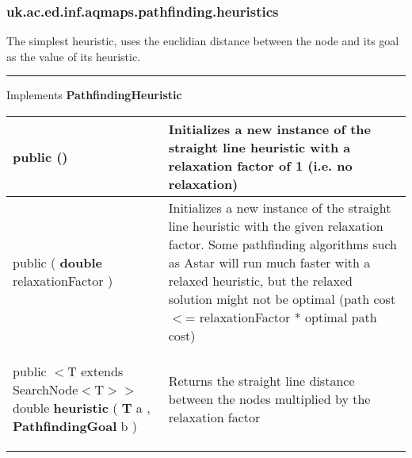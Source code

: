\subsubsection*{ uk.ac.ed.inf.aqmaps.pathfinding.heuristics }
 {\scriptsize The simplest heuristic, uses the euclidian distance between the node and its goal as the value of its heuristic.
 
\vspace*{4pt} \hrule \vspace*{3pt}
Implements \textbf{ PathfindingHeuristic }
\vspace*{-5pt} 
\begin{tabularx}{\linewidth}{X|m{}}
\label{tab:StraightLineDistance}
\begin{raggedleft}public  \textbf{\hyperref[tab:StraightLineDistance]{\color{blue}{StraightLineDistance}}}()
\end{raggedleft} &
 Initializes a new instance of the straight line heuristic with a relaxation factor of 1 (i.e. no relaxation)\\ \hline 
\begin{raggedleft}public  \textbf{\hyperref[tab:StraightLineDistance]{\color{blue}{StraightLineDistance}} }(\hspace*{ 5pt} \textbf{double} relaxationFactor  )
\end{raggedleft} &
 Initializes a new instance of the straight line heuristic with the given relaxation factor. Some pathfinding algorithms such as Astar will run much faster \newline%
 with a relaxed heuristic, but the relaxed solution might not be optimal (path cost $<$= relaxationFactor * optimal path cost)\\ \hline 
\begin{raggedleft}public $<$T extends SearchNode$<$T$>$$>$ double \textbf{heuristic }(\newline \hfill 
\hspace*{ 5pt} \textbf{T} a , \newline
 \hspace*{ 5pt} \textbf{PathfindingGoal} b  )
\end{raggedleft} &
 Returns the straight line distance between the nodes multiplied by the relaxation factor\\\end{tabularx}
}
